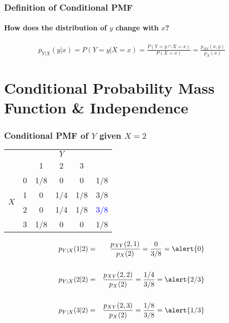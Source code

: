 \begin{frame}
\frametitle{Definition of Conditional PMF}
\framesubtitle{How does the distribution of $y$ change with $x$?}

\begin{eqnarray*}
	p_{Y|X}(y|x) = P(Y=y|X=x) =  \frac{P(Y=y \cap X=x)}{P(X=x)} =  \frac{p_{XY}(x,y)}{p_X(x)}
\end{eqnarray*}
\vspace{1em}


\end{frame}

\section{Conditional Probability Mass Function \& Independence}
\begin{frame}
\frametitle{Conditional PMF of $Y$ given $X = 2$}

\begin{table}
\begin{tabular}{|cc|ccc|c|}
\hline
&&\multicolumn{3}{c|}{$Y$}&\\
&&1 & 2&3&\\
\hline
\multirow{4}{*}{$X$}
&0& \multicolumn{1}{|c}{1/8} & 0& 0&1/8\\
&1& \multicolumn{1}{|c}{0} & 1/4&1/8&3/8\\
&2& \multicolumn{1}{|c}{\alert{0}} & \alert{1/4}&\alert{1/8}&\textcolor{blue}{3/8}\\
&3& \multicolumn{1}{|c}{1/8} & 0&0&1/8\\
\hline
\end{tabular}
\end{table}

\small
\begin{eqnarray*}
	p_{Y|X}(1|2) &=& \frac{p_{XY}(2,1)}{p_X(2)} = \frac{0}{3/8} =\alert{0}\\ \\
	p_{Y|X}(2|2) &=&\frac{p_{XY}(2,2)}{p_X(2)}= \frac{1/4}{3/8} =\alert{2/3} \\ \\ 
	 p_{Y|X}(3|2) &=&\frac{p_{XY}(2,3)}{p_X(2)} = \frac{1/8}{3/8} = \alert{1/3}
\end{eqnarray*}


\end{frame}
